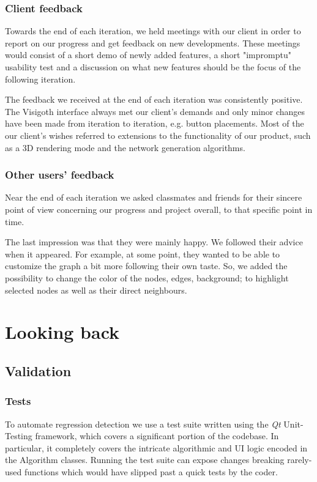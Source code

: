 \documentclass[a4paper,11pt,titlepage]{article}
\let\stdsection\section         %
\renewcommand{\section}{\newpage\stdsection}
\newcommand{\buzz}[1]{\emph{#1}}
\newcommand{\Qt}{\buzz{Qt} }
\begin{document}
\subsubsection{Client feedback}
Towards the end of each iteration, we held meetings with our client
in order to report on our progress and get feedback on new
developments. These meetings would consist of a short demo of newly
added features, a short "impromptu" usability test and a discussion
on what new features should be the focus of the following iteration.

The feedback we received at the end of each iteration was
consistently positive. The Visigoth interface always met our
client's demands and only minor changes have been made from
iteration to iteration, e.g. button placements. Most of the our
client's wishes referred to extensions to the functionality of
our product, such as a 3D rendering mode and the network generation
algorithms.


\subsubsection{Other users' feedback}
Near the end of each iteration we asked classmates and friends for
their sincere point of view concerning our progress and project
overall, to that specific point in time.

The last impression was that they were mainly happy. We followed their
advice when it appeared. For example, at some point, they wanted to be
able to customize the graph a bit more following their own taste. So,
we added the possibility to change the color of the nodes, edges,
background; to highlight selected nodes as well as their direct
neighbours.



\section{Looking back}

\subsection{Validation}

\subsubsection{Tests}
To automate regression detection we use a test suite written using the
\Qt Unit-Testing framework, which covers a significant portion of the
codebase. In particular, it completely covers the intricate
algorithmic and UI logic encoded in the Algorithm classes. Running the
test suite can expose changes breaking rarely-used functions which
would have slipped past a quick tests by the coder.
\end{document}

